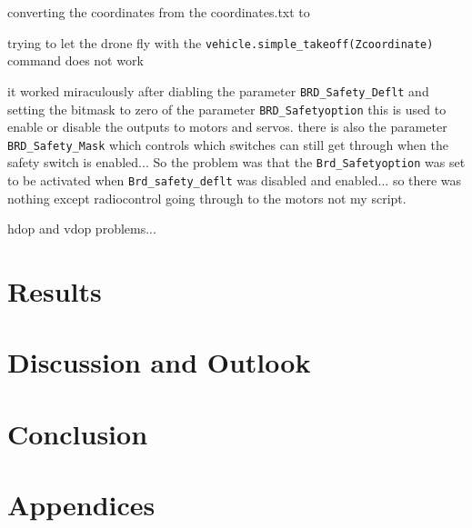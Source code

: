\documentclass[svgnames]{article}
\begin{document}
	
	converting the coordinates from the coordinates.txt to 
	
	trying to let the drone fly with the \lstinline|vehicle.simple_takeoff(Zcoordinate)| command does not work
	
	it worked miraculously after diabling the parameter \lstinline|BRD_Safety_Deflt| and setting the bitmask to zero of the parameter \lstinline|BRD_Safetyoption| 
	this is used to enable or disable the outputs to motors and servos. there is also the parameter \lstinline|BRD_Safety_Mask| which controls which switches can still get through when the safety switch is enabled... So the problem was that the \lstinline|Brd_Safetyoption| was set to be activated when \lstinline|Brd_safety_deflt| was disabled and enabled... so there was nothing except radiocontrol going through to the motors not my script.
	
	
	hdop and vdop problems...
	
	\section{Results}
	\section{Discussion and Outlook}
	\section{Conclusion}
	\newpage
	\renewcommand{\thesubsection}{\Alph{subsection}}
	\pagebreak
	\appendix
	\section{Appendices}

	\listoffigures	
	\pagebreak
	\newpage
	\printbibliography[
		heading=bibintoc,
		title={Bibliography}
	]
	
	\newpage
	\printglossary[type=\acronymtype]
	
\end{document}
